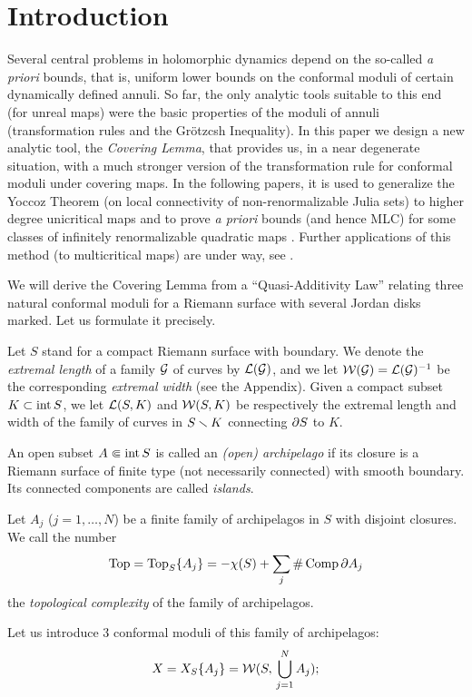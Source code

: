 

\section{Introduction} 

Several central problems in holomorphic dynamics depend on the so-called {\it a priori} bounds,
that is,  uniform lower bounds on the conformal moduli of certain dynamically defined annuli.
So far, the only analytic tools suitable to this end (for unreal maps) were the basic properties of the
moduli of annuli (transformation rules and  the Gr\"otzcsh Inequality).
In this paper we design a new analytic tool, 
the {\it Covering Lemma},  that provides us, in a near degenerate situation,
with a much stronger 
version of the transformation rule for conformal moduli under covering maps. In the following papers, it is used  to generalize the
Yoccoz Theorem (on local connectivity of non-renormalizable Julia sets) to higher degree unicritical maps \cite{high} and to prove {\it a priori} bounds 
(and hence MLC) for
some classes of infinitely renormalizable quadratic maps \cite{K,decorations}. 
Further applications of this method (to multicritical maps) are under way, see \cite{KS,Chinese}.   

We will derive the Covering Lemma from a ``Quasi-Additivity Law'' relating three natural conformal moduli
for a Riemann surface with several Jordan disks marked. 
Let us formulate it precisely.

Let $S$ stand for a compact Riemann surface with boundary.
We denote the {\it extremal length}  of a family ${\cal G}$ of curves by ${\cal L}({\cal G})$,
and we let ${\cal W}({\cal G})={\cal L}({\cal G})^{-1}$ be the corresponding {\it extremal width} (see the Appendix).
Given a compact subset  $K\subset \operatorname{int} S$, 
we let ${\cal L}(S,K)$ and ${\cal W}(S,K)$ be respectively the extremal length and
width of the family of curves in $S\smallsetminus K$ connecting $\partial S$ to $K$. 


An open subset $A\Subset  \operatorname{int} S $  is called an {\it (open) archipelago}
if its closure is a Riemann surface of finite type (not necessarily connected)
with smooth boundary. Its connected components are called {\it islands}.
 
Let $A_j$ ($j = 1,\dots, N$) be a finite family  of archipelagos 
in $S$ with disjoint closures. 
We call the number 
$$ {\mathrm{Top}}= {{\mathrm{Top}}}_S \{A_j \} = -\chi(S) + \sum_j \#\operatorname{Comp} \partial A_j $$
the {\it topological  complexity} of the family of archipelagos.

 Let us introduce 3 conformal moduli of this family of archipelagos:
$$
  X =X_S\{A_j\}= {\cal W}(S,\, \bigcup_{j=1}^N A_j);  
$$

